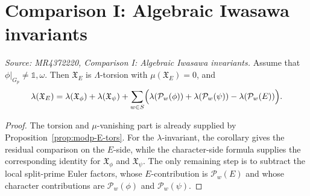 \section{Comparison I: Algebraic Iwasawa invariants}

\begin{theorem}
  \label{MAINalgside}
  \textit{Source: MR4372220, Comparison I: Algebraic Iwasawa invariants.}
  Assume that \(\phi|_{G_p}\neq \mathds{1},\omega\). Then \(\mathfrak X_E\) is \(\Lambda\)-torsion with \(\mu(\mathfrak X_E)=0\), and
  \[
  \lambda(\mathfrak X_E)=\lambda(\mathfrak X_\phi)+\lambda(\mathfrak X_\psi)
  +\sum_{w\in S}\Bigl(\lambda(\mathcal P_w(\phi))+\lambda(\mathcal P_w(\psi))-\lambda(\mathcal P_w(E))\Bigr).
  \]
\end{theorem}

\begin{proof}
The torsion and \(\mu\)-vanishing part is already supplied by Proposition~\ref{prop:modp-E-tors}. For the \(\lambda\)-invariant, the corollary gives the residual comparison on the \(E\)-side, while the character-side formula supplies the corresponding identity for \(\mathfrak X_\phi\) and \(\mathfrak X_\psi\). The only remaining step is to subtract the local split-prime Euler factors, whose \(E\)-contribution is \(\mathcal P_w(E)\) and whose character contributions are \(\mathcal P_w(\phi)\) and \(\mathcal P_w(\psi)\).
\end{proof}

